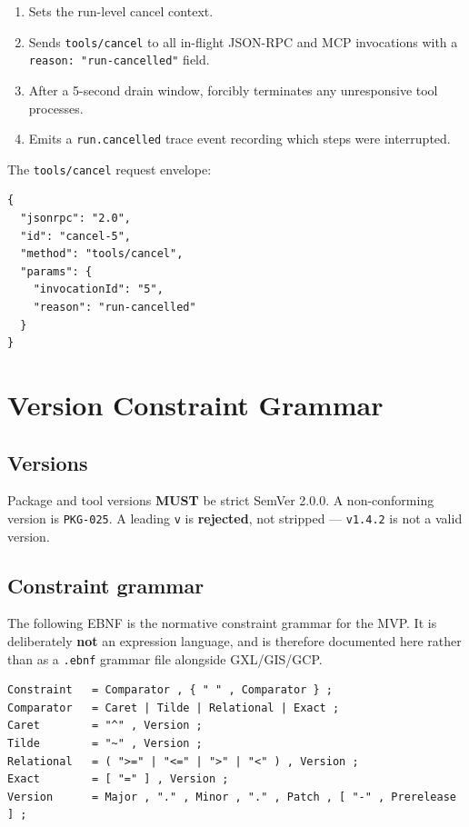 \begin{enumerate}
  \item Sets the run-level cancel context.
  \item Sends \texttt{tools/cancel} to all in-flight JSON-RPC and MCP
        invocations with a \texttt{reason: "run-cancelled"} field.
  \item After a 5-second drain window, forcibly terminates any unresponsive
        tool processes.
  \item Emits a \texttt{run.cancelled} trace event recording which steps were
        interrupted.
\end{enumerate}

The \texttt{tools/cancel} request envelope:

\begin{verbatim}
{
  "jsonrpc": "2.0",
  "id": "cancel-5",
  "method": "tools/cancel",
  "params": {
    "invocationId": "5",
    "reason": "run-cancelled"
  }
}
\end{verbatim}

\section{Version Constraint Grammar}
\label{sec:tool-version-grammar}

\subsection{Versions}

Package and tool versions \textbf{MUST} be strict SemVer 2.0.0. A
non-conforming version is \texttt{PKG-025}. A leading \texttt{v} is
\textbf{rejected}, not stripped --- \texttt{v1.4.2} is not a valid version.

\subsection{Constraint grammar}

The following EBNF is the normative constraint grammar for the MVP. It is
deliberately \textbf{not} an expression language, and is therefore documented
here rather than as a \texttt{.ebnf} grammar file alongside GXL/GIS/GCP.

\begin{verbatim}
Constraint   = Comparator , { " " , Comparator } ;
Comparator   = Caret | Tilde | Relational | Exact ;
Caret        = "^" , Version ;
Tilde        = "~" , Version ;
Relational   = ( ">=" | "<=" | ">" | "<" ) , Version ;
Exact        = [ "=" ] , Version ;
Version      = Major , "." , Minor , "." , Patch , [ "-" , Prerelease ] ;
\end{verbatim}

